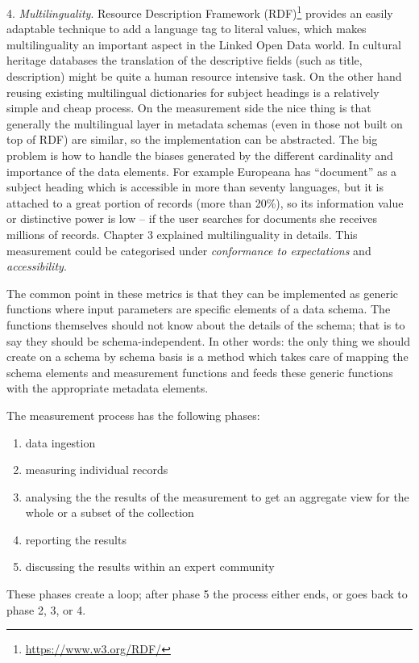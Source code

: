 4. \emph{Multilinguality}. Resource Description Framework (RDF)\footnote{\url{https://www.w3.org/RDF/}} provides an easily adaptable technique to add a language tag to literal values, which makes multilinguality an important aspect in the Linked Open Data world. In cultural heritage databases the translation of the descriptive fields (such as title, description) might be quite a human resource intensive task. On the other hand reusing existing multilingual dictionaries for subject headings is a relatively simple and cheap process. On the measurement side the nice thing is that generally the multilingual layer in metadata schemas (even in those not built on top of RDF) are similar, so the implementation can be abstracted. The big problem is how to handle the biases generated by the different cardinality and importance of the data elements. For example Europeana has ``document'' as a subject heading which is accessible in more than seventy languages, but it is attached to a great portion of records (more than 20\%), so its information value or distinctive power is low -- if the user searches for documents she receives millions of records. Chapter 3 explained multilinguality in details. This measurement could be categorised under \emph{conformance to expectations} and \emph{accessibility}.

The common point in these metrics is that they can be implemented as generic functions where input parameters are specific elements of a data schema. The functions themselves should not know about the details of the schema; that is to say they should be schema-independent. In other words: the only thing we should create on a schema by schema basis is a method which takes care of mapping the schema elements and measurement functions and feeds these generic functions with the appropriate metadata elements.

The measurement process has the following phases: 
\begin{enumerate}
  \item data ingestion
  \item measuring individual records
  \item analysing the the results of the measurement to get an aggregate view for the whole or a subset of the collection
  \item reporting the results
  \item discussing the results within an expert community
\end{enumerate}

These phases create a loop; after phase 5 the process either ends, or goes back to phase 2, 3, or 4.

